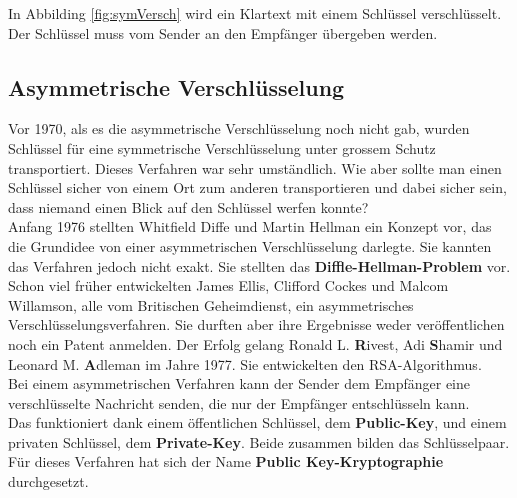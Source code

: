 In Abbilding \ref{fig:symVersch} wird ein Klartext mit einem Schlüssel verschlüsselt. Der Schlüssel muss vom Sender an den Empfänger übergeben werden. 
%
\subsection{Asymmetrische Verschlüsselung}
Vor 1970, als es die asymmetrische Verschlüsselung noch nicht gab, wurden Schlüssel für eine symmetrische Verschlüsselung unter grossem Schutz transportiert.
%
Dieses Verfahren war sehr umständlich. %
Wie aber sollte man einen Schlüssel sicher von einem Ort zum anderen transportieren und dabei sicher sein, dass niemand einen Blick auf den Schlüssel werfen konnte?\\
%
Anfang 1976 stellten Whitfield Diffe und Martin Hellman ein Konzept vor, das die Grundidee von einer asymmetrischen Verschlüsselung darlegte. Sie kannten das Verfahren jedoch nicht exakt. Sie stellten das \textbf{Diffle-Hellman-Problem} vor. \cite{rsa_and_public_key}\\ %
Schon viel früher entwickelten James Ellis, Clifford Cockes und Malcom Willamson, alle vom Britischen Geheimdienst, ein asymmetrisches Verschlüsselungsverfahren. Sie durften aber ihre Ergebnisse weder veröffentlichen noch ein Patent anmelden. 
Der Erfolg gelang Ronald L. \textbf{R}ivest, Adi \textbf{S}hamir und Leonard M. \textbf{A}dleman im Jahre 1977. Sie entwickelten den RSA-Algorithmus.\\[2ex]
%
Bei einem asymmetrischen Verfahren kann der Sender dem Empfänger eine verschlüsselte Nachricht senden, die nur der Empfänger entschlüsseln kann.\\
%
Das funktioniert dank einem öffentlichen Schlüssel, dem \textbf{Public-Key}, und einem privaten Schlüssel, dem \textbf{Private-Key}. Beide zusammen bilden das Schlüsselpaar.\\
Für dieses Verfahren hat sich der Name \textbf{Public Key-Kryptographie} durchgesetzt.
%
